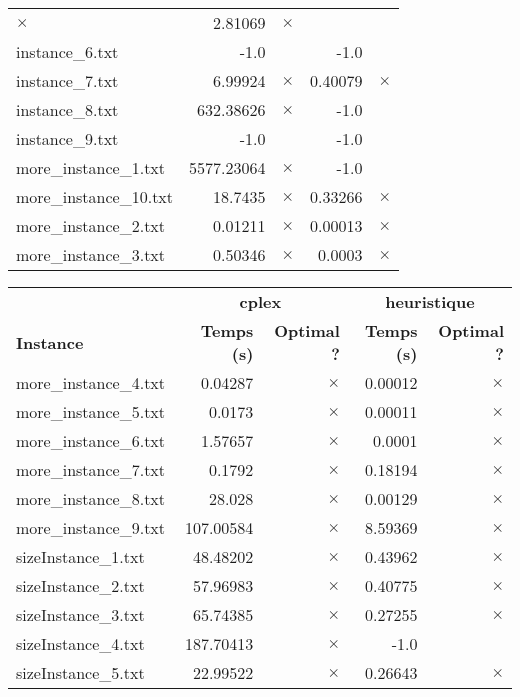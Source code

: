 \documentclass{article}
\begin{document}
\begin{center}
\begin{tabular}{lrrrr}
$\times$
 & 2.81069 & 
$\times$
\\
instance\_6.txt & -1.0 & 
 & -1.0 & 
\\
instance\_7.txt & 6.99924 & 
$\times$
 & 0.40079 & 
$\times$
\\
instance\_8.txt & 632.38626 & 
$\times$
 & -1.0 & 
\\
instance\_9.txt & -1.0 & 
 & -1.0 & 
\\
more\_instance\_1.txt & 5577.23064 & 
$\times$
 & -1.0 & 
\\
more\_instance\_10.txt & 18.7435 & 
$\times$
 & 0.33266 & 
$\times$
\\
more\_instance\_2.txt & 0.01211 & 
$\times$
 & 0.00013 & 
$\times$
\\
more\_instance\_3.txt & 0.50346 & 
$\times$
 & 0.0003 & 
$\times$
\\
\hline\end{tabular}
\end{center}

\newpage
\begin{center}
\renewcommand{\arraystretch}{1.4} 
 \begin{tabular}{lrrrr}
	\hline
 & \multicolumn{2}{c}{\textbf{cplex}} & \multicolumn{2}{c}{\textbf{heuristique}}\\
\textbf{Instance}  & \textbf{Temps (s)} & \textbf{Optimal ?}  & \textbf{Temps (s)} & \textbf{Optimal ?} \\\hline

more\_instance\_4.txt & 0.04287 & 
$\times$
 & 0.00012 & 
$\times$
\\
more\_instance\_5.txt & 0.0173 & 
$\times$
 & 0.00011 & 
$\times$
\\
more\_instance\_6.txt & 1.57657 & 
$\times$
 & 0.0001 & 
$\times$
\\
more\_instance\_7.txt & 0.1792 & 
$\times$
 & 0.18194 & 
$\times$
\\
more\_instance\_8.txt & 28.028 & 
$\times$
 & 0.00129 & 
$\times$
\\
more\_instance\_9.txt & 107.00584 & 
$\times$
 & 8.59369 & 
$\times$
\\
sizeInstance\_1.txt & 48.48202 & 
$\times$
 & 0.43962 & 
$\times$
\\
sizeInstance\_2.txt & 57.96983 & 
$\times$
 & 0.40775 & 
$\times$
\\
sizeInstance\_3.txt & 65.74385 & 
$\times$
 & 0.27255 & 
$\times$
\\
sizeInstance\_4.txt & 187.70413 & 
$\times$
 & -1.0 & 
\\
sizeInstance\_5.txt & 22.99522 & 
$\times$
 & 0.26643 & 
$\times$
\\
\hline\end{tabular}
\end{center}
\end{document}
